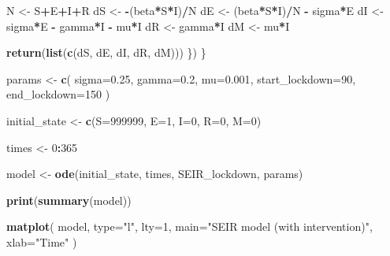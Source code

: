 \documentclass[
]{article}
\newenvironment{Shaded}{\begin{snugshade}}{\end{snugshade}}
\newcommand{\AttributeTok}[1]{\textcolor[rgb]{0.13,0.29,0.53}{#1}}
\newcommand{\DecValTok}[1]{\textcolor[rgb]{0.00,0.00,0.81}{#1}}
\newcommand{\FloatTok}[1]{\textcolor[rgb]{0.00,0.00,0.81}{#1}}
\newcommand{\FunctionTok}[1]{\textcolor[rgb]{0.13,0.29,0.53}{\textbf{#1}}}
\newcommand{\NormalTok}[1]{#1}
\newcommand{\OtherTok}[1]{\textcolor[rgb]{0.56,0.35,0.01}{#1}}
\newcommand{\SpecialCharTok}[1]{\textcolor[rgb]{0.81,0.36,0.00}{\textbf{#1}}}
\newcommand{\StringTok}[1]{\textcolor[rgb]{0.31,0.60,0.02}{#1}}
\begin{document}
\begin{Shaded}
\begin{Highlighting}[]
\NormalTok{      N }\OtherTok{\textless{}{-}}\NormalTok{ S}\SpecialCharTok{+}\NormalTok{E}\SpecialCharTok{+}\NormalTok{I}\SpecialCharTok{+}\NormalTok{R}
\NormalTok{      dS }\OtherTok{\textless{}{-}} \SpecialCharTok{{-}}\NormalTok{(beta}\SpecialCharTok{*}\NormalTok{S}\SpecialCharTok{*}\NormalTok{I)}\SpecialCharTok{/}\NormalTok{N}
\NormalTok{      dE }\OtherTok{\textless{}{-}}\NormalTok{ (beta}\SpecialCharTok{*}\NormalTok{S}\SpecialCharTok{*}\NormalTok{I)}\SpecialCharTok{/}\NormalTok{N }\SpecialCharTok{{-}}\NormalTok{ sigma}\SpecialCharTok{*}\NormalTok{E}
\NormalTok{      dI }\OtherTok{\textless{}{-}}\NormalTok{ sigma}\SpecialCharTok{*}\NormalTok{E }\SpecialCharTok{{-}}\NormalTok{ gamma}\SpecialCharTok{*}\NormalTok{I }\SpecialCharTok{{-}}\NormalTok{ mu}\SpecialCharTok{*}\NormalTok{I}
\NormalTok{      dR }\OtherTok{\textless{}{-}}\NormalTok{ gamma}\SpecialCharTok{*}\NormalTok{I}
\NormalTok{      dM }\OtherTok{\textless{}{-}}\NormalTok{ mu}\SpecialCharTok{*}\NormalTok{I}
      
      \FunctionTok{return}\NormalTok{(}\FunctionTok{list}\NormalTok{(}\FunctionTok{c}\NormalTok{(dS, dE, dI, dR, dM)))}
\NormalTok{    \})}
\NormalTok{  \}}
  
\NormalTok{  params }\OtherTok{\textless{}{-}} \FunctionTok{c}\NormalTok{(}
    \AttributeTok{sigma=}\FloatTok{0.25}\NormalTok{,}
    \AttributeTok{gamma=}\FloatTok{0.2}\NormalTok{,}
    \AttributeTok{mu=}\FloatTok{0.001}\NormalTok{,}
    \AttributeTok{start\_lockdown=}\DecValTok{90}\NormalTok{,}
    \AttributeTok{end\_lockdown=}\DecValTok{150}
\NormalTok{    )}
  
\NormalTok{  initial\_state }\OtherTok{\textless{}{-}} \FunctionTok{c}\NormalTok{(}\AttributeTok{S=}\DecValTok{999999}\NormalTok{, }\AttributeTok{E=}\DecValTok{1}\NormalTok{, }\AttributeTok{I=}\DecValTok{0}\NormalTok{, }\AttributeTok{R=}\DecValTok{0}\NormalTok{, }\AttributeTok{M=}\DecValTok{0}\NormalTok{)}
  
\NormalTok{  times }\OtherTok{\textless{}{-}} \DecValTok{0}\SpecialCharTok{:}\DecValTok{365}
  
\NormalTok{  model }\OtherTok{\textless{}{-}} \FunctionTok{ode}\NormalTok{(initial\_state, times, SEIR\_lockdown, params)}
  
  \FunctionTok{print}\NormalTok{(}\FunctionTok{summary}\NormalTok{(model))}
  
  \FunctionTok{matplot}\NormalTok{(}
\NormalTok{    model, }
    \AttributeTok{type=}\StringTok{"l"}\NormalTok{,}
    \AttributeTok{lty=}\DecValTok{1}\NormalTok{, }
    \AttributeTok{main=}\StringTok{"SEIR model (with intervention)"}\NormalTok{, }
    \AttributeTok{xlab=}\StringTok{"Time"}
\NormalTok{    )}
  

\end{Highlighting}
\end{Shaded}
\end{document}
